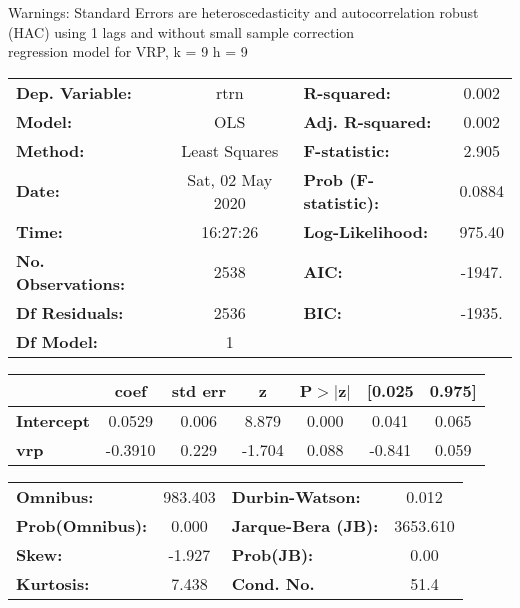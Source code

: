 Warnings: \newline
 [1] Standard Errors are heteroscedasticity and autocorrelation robust (HAC) using 1 lags and without small sample correction\\ 

regression model for VRP, k = 9 h = 9\begin{center}
\begin{tabular}{lclc}
\toprule
\textbf{Dep. Variable:}    &       rtrn       & \textbf{  R-squared:         } &     0.002   \\
\textbf{Model:}            &       OLS        & \textbf{  Adj. R-squared:    } &     0.002   \\
\textbf{Method:}           &  Least Squares   & \textbf{  F-statistic:       } &     2.905   \\
\textbf{Date:}             & Sat, 02 May 2020 & \textbf{  Prob (F-statistic):} &   0.0884    \\
\textbf{Time:}             &     16:27:26     & \textbf{  Log-Likelihood:    } &    975.40   \\
\textbf{No. Observations:} &        2538      & \textbf{  AIC:               } &    -1947.   \\
\textbf{Df Residuals:}     &        2536      & \textbf{  BIC:               } &    -1935.   \\
\textbf{Df Model:}         &           1      & \textbf{                     } &             \\
\bottomrule
\end{tabular}
\begin{tabular}{lcccccc}
                   & \textbf{coef} & \textbf{std err} & \textbf{z} & \textbf{P$> |$z$|$} & \textbf{[0.025} & \textbf{0.975]}  \\
\midrule
\textbf{Intercept} &       0.0529  &        0.006     &     8.879  &         0.000        &        0.041    &        0.065     \\
\textbf{vrp}       &      -0.3910  &        0.229     &    -1.704  &         0.088        &       -0.841    &        0.059     \\
\bottomrule
\end{tabular}
\begin{tabular}{lclc}
\textbf{Omnibus:}       & 983.403 & \textbf{  Durbin-Watson:     } &    0.012  \\
\textbf{Prob(Omnibus):} &   0.000 & \textbf{  Jarque-Bera (JB):  } & 3653.610  \\
\textbf{Skew:}          &  -1.927 & \textbf{  Prob(JB):          } &     0.00  \\
\textbf{Kurtosis:}      &   7.438 & \textbf{  Cond. No.          } &     51.4  \\
\bottomrule
\end{tabular}
\end{center}

